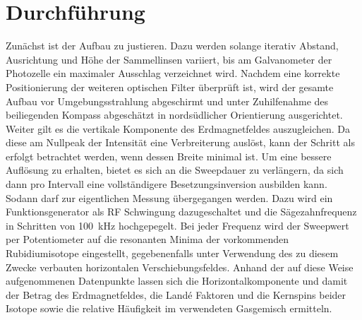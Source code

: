 \section{Durchführung}
\label{sec:durchführung}

Zunächst ist der Aufbau zu justieren. Dazu werden solange iterativ Abstand, Ausrichtung und Höhe der Sammellinsen variiert, bis am
Galvanometer der Photozelle ein maximaler Ausschlag verzeichnet wird. Nachdem eine korrekte Positionierung der weiteren optischen
Filter überprüft ist, wird der gesamte Aufbau vor Umgebungsstrahlung abgeschirmt und unter Zuhilfenahme des beiliegenden Kompass
abgeschätzt in nordsüdlicher Orientierung ausgerichtet. Weiter gilt es die vertikale Komponente des Erdmagnetfeldes
auszugleichen. Da diese am Nullpeak der Intensität eine Verbreiterung auslöst, kann der Schritt als erfolgt betrachtet werden,
wenn dessen Breite minimal ist. Um eine bessere Auflösung zu erhalten, bietet es sich an die Sweepdauer zu verlängern, da sich
dann pro Intervall eine vollständigere Besetzungsinversion ausbilden kann. Sodann darf zur eigentlichen Messung übergegangen werden.
Dazu wird ein Funktionsgenerator als RF Schwingung dazugeschaltet und die Sägezahnfrequenz in Schritten von \qty{100}{\kilo\hertz} 
hochgepegelt. Bei jeder Frequenz wird der Sweepwert per Potentiometer auf die resonanten Minima der vorkommenden Rubidiumisotope
eingestellt, gegebenenfalls unter Verwendung des zu diesem Zwecke verbauten horizontalen Verschiebungsfeldes. Anhand der auf diese
Weise aufgenommenen Datenpunkte lassen sich die Horizontalkomponente und damit der Betrag des Erdmagnetfeldes, die Landé Faktoren
und die Kernspins beider Isotope sowie die relative Häufigkeit im verwendeten Gasgemisch ermitteln.
